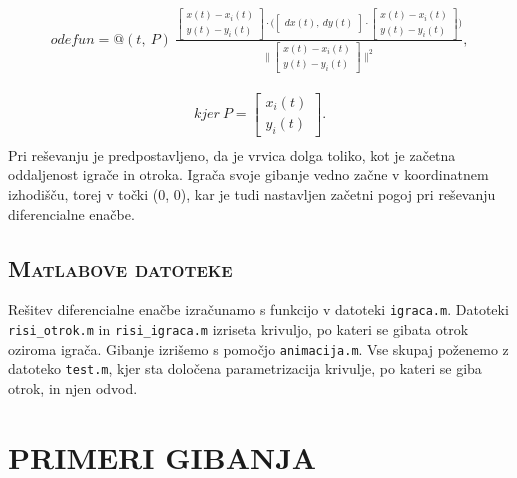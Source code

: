 \documentclass[a4paper,12pt]{article}
\begin{document}
\begin{align*}
    odefun = @(t,\ P) 
    \
    \frac{
        \begin{bmatrix} 
            x(t) - x_i(t) \\
            y(t) - y_i(t)
        \end{bmatrix}
        \cdot
        \Big(
        \begin{bmatrix} 
            dx(t), \ %
            dy(t)
        \end{bmatrix}
        \cdot
        \begin{bmatrix} 
            x(t) - x_i(t) \\
            y(t) - y_i(t)
        \end{bmatrix}
        \Big)
        }
        {
        \Big \|
        \begin{bmatrix} 
            x(t) - x_i(t) \\
            y(t) - y_i(t)
        \end{bmatrix}
        \Big \| ^ {2}
        },
\end{align*}

\begin{align*}
    kjer \ P = 
        \begin{bmatrix} 
            x_i(t) \\
            y_i(t)
        \end{bmatrix}
    .
    \\
\end{align*}
Pri reševanju je predpostavljeno, da je vrvica dolga toliko, kot je začetna oddaljenost igrače in otroka. 
Igrača svoje gibanje vedno začne v koordinatnem izhodišču, torej v točki (0, 0), kar je tudi nastavljen začetni pogoj pri reševanju diferencialne enačbe. 


\subsection{\textsc{Matlabove datoteke}}

Rešitev diferencialne enačbe izračunamo s funkcijo v datoteki {\texttt{igraca.m}}. Datoteki {\texttt{risi\_otrok.m}} in {\texttt{risi\_igraca.m}} izriseta krivuljo, 
po kateri se gibata otrok oziroma igrača. Gibanje izrišemo s pomočjo {\texttt{animacija.m}}. 
Vse skupaj poženemo z datoteko {\texttt{test.m}}, kjer sta določena parametrizacija krivulje, po kateri se giba otrok, in njen odvod.

\newpage
\section{\textsc{\large{PRIMERI GIBANJA}}}
\end{document}

